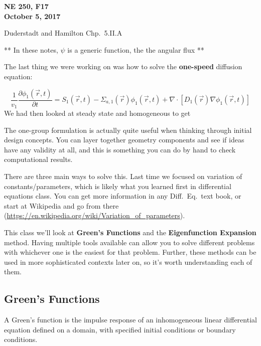 \documentclass[12pt]{article}
\newif\ifeqns
\newcommand{\rvec}{\ensuremath{\vec{r}}}
\newcommand{\vecr}{\ensuremath{\vec{r}}}
\begin{document}
\begin{center}
{\bf NE 250, F17\\
October 5, 2017 
}
\end{center}

Duderstadt and Hamilton Chp.\ 5.II.A

** In these notes, $\psi$ is a generic function, the the angular flux **

The last thing we were working on was how to solve the \textbf{one-speed} diffusion equation:

\begin{equation*}
\frac{1}{v_1}\frac{\partial \phi_1(\rvec,t)}{\partial t} = S_1(\rvec,t) - 
\Sigma_{a,1}(\rvec)\phi_1(\rvec,t) + \nabla\cdot[D_1(\rvec)\nabla\phi_1(\rvec,t)]
\end{equation*}
We had then looked at steady state and homogeneous to get 
\ifeqns
\begin{equation*}
\nabla^2\phi(\vecr) - \frac{1}{L^2}\phi(\rvec) = -\frac{S(\rvec)}{D},
\end{equation*}
\else
\vspace*{3em}
\fi

The one-group formulation is actually quite useful when thinking through initial design concepts. You can layer together geometry components and see if ideas have any validity at all, and this is something you can do by hand to check computational results. 

There are three main ways to solve this. Last time we focused on variation of constants/parameters, which is likely what you learned first in differential equations class. You can get more information in any Diff.\ Eq.\ text book, or start at Wikipedia and go from there (\url{https://en.wikipedia.org/wiki/Variation_of_parameters}).

This class we'll look at \textbf{Green's Functions} and the \textbf{Eigenfunction Expansion} method. Having multiple tools available can allow you to solve different problems with whichever one is the easiest for that problem. Further, these methods can be used in more sophisticated contexts later on, so it's worth understanding each of them. 

\subsection*{Green's Functions}
A Green's function is the impulse response of an inhomogeneous linear differential equation defined on a domain, with specified initial conditions or boundary conditions.
\end{document}
